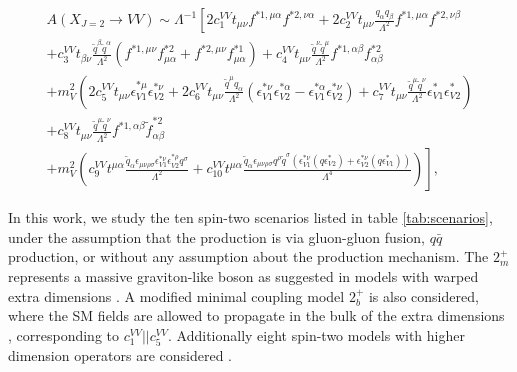 \begin{multline}
\label{eq:ampl-spin2-a}
A(X_{J=2} \to VV)  \sim \Lambda^{-1} \left [
2 c_{1}^{VV} t_{\mu \nu} f^{*1,\mu \alpha} f^{*2,\nu \alpha}
+ 2 c_{2}^{VV} t_{\mu \nu} \frac{q_\alpha q_\beta }{\Lambda^2} f^{*1,\mu \alpha}  f^{*2,\nu \beta}
\right.   \\
\left.
+ c_{3}^{VV} t_{\beta \nu} \frac{{\tilde q}^\beta {\tilde q}^{\alpha}}{\Lambda^2}
 ( f^{*1,\mu \nu} f^{*2}_{\mu \alpha} + f^{*2,\mu \nu} f^{*1}_{\mu \alpha} )
 + c_{ 4}^{VV}t_{\mu \nu} \frac{{\tilde q}^{\nu} {\tilde q}^\mu}{{\Lambda^2} }  f^{*1,\alpha \beta} f^{*2}_{\alpha \beta}
\right.\\
\left. + m_{V}^2  \left (
2 c_{ 5}^{VV}  t_{\mu\nu} \epsilon_{V1}^{*\mu} \epsilon_{V2}^{*\nu}
+2 c_{ 6}^{VV}  t_{\mu \nu} \frac{{\tilde q}^\mu q_\alpha}{\Lambda^2}
\left ( \epsilon_{V1}^{*\nu} \epsilon_{V2}^{*\alpha} -
\epsilon_{V1}^{*\alpha} \epsilon_{V2}^{*\nu} \right )
+c_{ 7}^{VV} t_{\mu \nu}  \frac{{\tilde q}^\mu {\tilde q}^\nu}{\Lambda^2}  \epsilon^*_{V1} \epsilon^*_{V2}
\right)
\right.  \\
\left.
+c_{ 8}^{VV} t_{\mu \nu} \frac{{\tilde q}^{\mu} {\tilde q}^{\nu}}{\Lambda^2}
  f^{*1,\alpha \beta} {\tilde f}^{*2}_{\alpha \beta}
\right.   \\
 \left.
+  m_{V}^2  \left (
c_{ 9}^{VV} t^{\mu \alpha}
\frac{
{\tilde q}_{\alpha} \epsilon_{\mu \nu \rho \sigma} \epsilon_{V1}^{*\nu} \epsilon_{V2}^{*\rho} q^{\sigma}
}{\Lambda^2}
+c_{ 10}^{VV} t^{\mu \alpha}
\frac{
{\tilde q}_{\alpha} \epsilon_{\mu \nu \rho \sigma} q^\rho {\tilde q}^{\sigma}
\left ( \epsilon_{V1}^{*\nu}(q\epsilon_{V2}^*)+
\epsilon_{V2}^{*\nu}(q\epsilon_{V1}^*) \right )
}{\Lambda^4}
\right )
\right ],
\end{multline}


In this work, we study the ten spin-two scenarios listed in table \ref{tab:scenarios}, under the assumption that the production is via gluon-gluon fusion, $q\bar{q}$ production, or without any assumption about the production mechanism. The $2_m^+$ represents a massive graviton-like boson as suggested in models with warped extra dimensions \cite{Randall:1999vf, Randall:1999ee}. A modified minimal coupling model $2^+_{b}$ is also considered, where the SM fields are allowed to propagate in the bulk of the extra dimensions \cite{Agashe:2007zd}, corresponding to $c_1^{VV} || c_5^{VV}$. Additionally eight spin-two models with higher dimension operators are considered \cite{Khachatryan:2014kca}.

